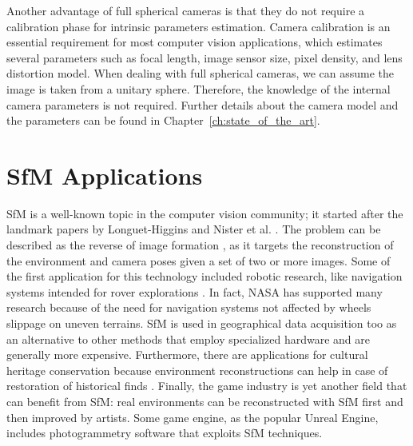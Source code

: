 Another advantage of full spherical cameras is that they do not require a calibration phase for intrinsic parameters estimation. Camera calibration is an essential requirement for most computer vision applications, which estimates several parameters such as focal length, image 
sensor size, pixel density, and lens distortion model. When dealing with full spherical cameras, we can assume the image is taken from a unitary sphere. Therefore, the knowledge of the internal camera parameters is not required. 
Further details about the camera model and the parameters can be found in Chapter~\ref{ch:state_of_the_art}.

\section{SfM Applications}
SfM is a well-known topic in the computer vision community; it started after 
the landmark papers by Longuet-Higgins \cite{longuet1981computer} and
Nister et al. \cite{moravec1980obstacle}.
The problem can be described as the reverse of image formation
\cite{Wei2013}, as it targets the reconstruction of the environment 
and camera poses given a set of two or more images.
Some of the first application for this technology included robotic research, 
like navigation systems intended for rover explorations 
\cite{moravec1980obstacle,durrant1996localization}. In fact, NASA has supported
many research because of the need for navigation systems not affected by wheels
slippage on uneven terrains.
SfM is used in geographical data acquisition too
\cite{fonstad2013topographic, westoby2012structure, james2012straightforward}
as an alternative to other methods that employ specialized hardware and are generally more expensive.
Furthermore, there are applications for cultural heritage conservation because 
environment reconstructions can help in case of restoration of historical finds
\cite{kraus2007photogrammetry}.
Finally, the game industry is yet another field that can benefit from 
SfM: real environments can be reconstructed with SfM first and then 
improved by artists. Some game engine, as the popular Unreal Engine,
includes photogrammetry software that exploits SfM techniques. 

